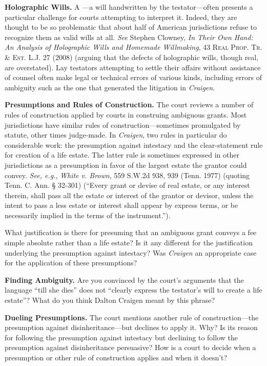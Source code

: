
\item \textbf{Holographic Wills.} A ---a will handwritten
by the
testator---often presents a particular challenge for courts attempting to
interpret it. Indeed, they are thought to be so problematic that about half of
American jurisdictions refuse to recognize them as valid wills at all.
\textit{See} Stephen Clowney, \textit{In Their Own Hand: An Analysis of
Holographic Wills and Homemade Willmaking}, 43 \textsc{Real Prop. Tr. \&
Est. L.J.} 27 (2008) (arguing that the defects of holographic wills,
though real, are overstated). Lay testators attempting to settle their affairs
without assistance of counsel often make legal or technical errors of various
kinds, including errors of ambiguity such as the one that generated the
litigation in \textit{Craigen}.


\item \textbf{Presumptions and Rules of Construction.} The court reviews a
number of rules of construction applied by courts in construing ambiguous
grants. Most jurisdictions have similar rules of construction---sometimes
promulgated by statute, other times judge-made. In \textit{Craigen}, two rules
in particular do considerable work: the presumption against intestacy and the
clear-statement rule for creation of a life estate. The latter rule is
sometimes expressed in other jurisdictions as a presumption in favor of the
largest estate the grantor could convey. \textit{See, e.g.}, \textit{White v.
Brown}, 559 S.W.2d 938, 939 (Tenn. 1977) (quoting Tenn. C. Ann. {\S} 32-301)
(``Every grant or devise of real estate, or any interest therein, shall pass
all the estate or interest of the grantor or devisor, unless the intent to pass
a less estate or interest shall appear by express terms, or be necessarily
implied in the terms of the instrument.'').


What justification is there for presuming that an ambiguous grant conveys a fee
simple absolute rather than a life estate? Is it any different for the
justification underlying the presumption against intestacy? Was
\textit{Craigen} an appropriate case for the application of these presumptions?



\item \textbf{Finding Ambiguity.} Are you convinced by the court's arguments
that the language ``till she dies'' does not ``clearly express the testator's
will to create a life estate''? What do you think Dalton Craigen meant by this
phrase?


\item \textbf{Dueling Presumptions.} The court mentions another rule of
construction---the presumption against disinheritance---but declines to apply
it. Why? Is its reason for following the presumption against intestacy but
declining to follow the presumption against disinheritance persuasive? How is a
court to decide when a presumption or other rule of construction applies and
when it doesn't?

